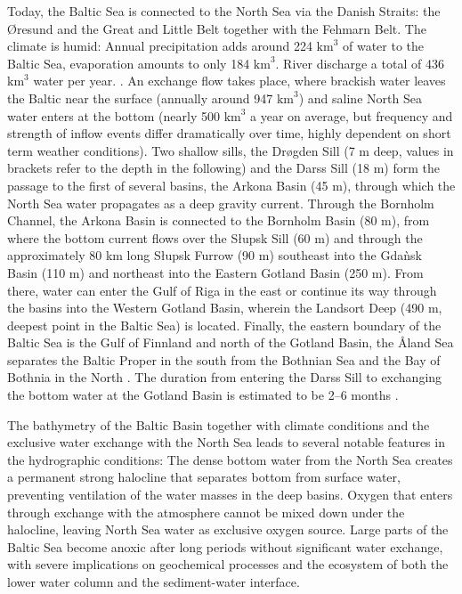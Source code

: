 Today, the Baltic Sea is connected to the North Sea via the Danish Straits: the \O resund and the Great and Little Belt together with the Fehmarn Belt. The climate is humid: Annual precipitation adds around 224 $\text{km}^3$ of water to the Baltic Sea, evaporation amounts to only 184 $\text{km}^3$. River discharge a total of 436 $\text{km}^3$ water per year. \citep[][]{reissmann2009}. An exchange flow takes place, where brackish water leaves the Baltic near the surface (annually around 947 $\text{km}^3$) and saline North Sea water enters at the bottom (nearly 500 $\text{km}^3$ a year on average, but frequency and strength of inflow events differ dramatically over time, highly dependent on short term weather conditions). Two shallow sills, the Dr\o gden Sill (7 m deep, values in brackets refer to the depth in the following) and the Darss Sill (18 m) form the passage to the first of several basins, the Arkona Basin (45 m), through which the North Sea water propagates as a deep gravity current. Through the Bornholm Channel, the Arkona Basin is connected to the Bornholm Basin (80 m), from where the bottom current flows over the S\l upsk Sill (60 m) and through the approximately 80 km long S\l upsk Furrow (90 m) southeast into the Gda\`{n}sk Basin (110 m) and northeast into the Eastern Gotland Basin (250 m). From there, water can enter the Gulf of Riga in the east or continue its way through the basins into the Western Gotland Basin, wherein the Landsort Deep (490 m, deepest point in the Baltic Sea) is located. Finally, the eastern boundary of the Baltic Sea is the Gulf of Finnland and north of the Gotland Basin, the \r{A}land Sea separates the Baltic Proper in the south from the Bothnian Sea and the Bay of Bothnia in the North \citep[][]{reissmann2009}. The duration from entering the Darss Sill to exchanging the bottom water at the Gotland Basin is estimated to be 2--6 months \citep[][]{balticsea}. 

The bathymetry of the Baltic Basin together with climate conditions and the exclusive water exchange with the North Sea leads to several notable features in the hydrographic conditions: The dense bottom water from the North Sea creates a permanent strong halocline that separates bottom from surface water, preventing ventilation of the water masses in the deep basins. Oxygen that enters through exchange with the atmosphere cannot be mixed down under the halocline, leaving North Sea water as exclusive oxygen source. Large parts of the Baltic Sea become anoxic after long periods without significant water exchange, with severe implications on geochemical processes and the ecosystem of both the lower water column and the sediment-water interface. 

